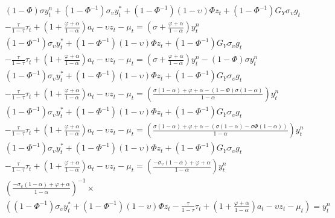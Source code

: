 \begin{align}    
    &(1 - \Phi)\sigma y^n_t +(1 - \Phi^{-1}) \sigma_\upsilon y^*_t + (1 - \Phi^{-1}) (1-\upsilon)\Phi z_t + (1 - \Phi^{-1}) G_Y \sigma_\upsilon g_t \nonumber \\
        &- \frac{\tau}{1-\tau}\tau_t  + \left(1 + \frac{\varphi + \alpha}{1-\alpha}\right)a_t - \upsilon z_t -\mu_t = \left(\sigma + \frac{\varphi + \alpha}{1-\alpha}\right)y^n_t\\
    &(1 - \Phi^{-1}) \sigma_\upsilon y^*_t + (1 - \Phi^{-1}) (1-\upsilon)\Phi z_t + (1 - \Phi^{-1}) G_Y \sigma_\upsilon g_t \nonumber \\ 
        &- \frac{\tau}{1-\tau}\tau_t  + \left(1 + \frac{\varphi + \alpha}{1-\alpha}\right)a_t - \upsilon z_t -\mu_t = \left(\sigma + \frac{\varphi + \alpha}{1-\alpha}\right)y^n_t - (1 - \Phi)\sigma y^n_t\\
    &(1 - \Phi^{-1}) \sigma_\upsilon y^*_t + (1 - \Phi^{-1}) (1-\upsilon)\Phi z_t + (1 - \Phi^{-1}) G_Y \sigma_\upsilon g_t \nonumber \\ 
        &- \frac{\tau}{1-\tau}\tau_t  + \left(1 + \frac{\varphi + \alpha}{1-\alpha}\right)a_t - \upsilon z_t -\mu_t = \left(\frac{\sigma(1-\alpha) + \varphi + \alpha-(1-\Phi)\sigma(1-\alpha)}{1-\alpha}\right)y^n_t\\
    &(1 - \Phi^{-1}) \sigma_\upsilon y^*_t + (1 - \Phi^{-1}) (1-\upsilon)\Phi z_t + (1 - \Phi^{-1}) G_Y \sigma_\upsilon g_t \nonumber \\ 
        &- \frac{\tau}{1-\tau}\tau_t  + \left(1 + \frac{\varphi + \alpha}{1-\alpha}\right)a_t - \upsilon z_t -\mu_t = \left(\frac{\sigma(1-\alpha) + \varphi + \alpha-(\sigma(1-\alpha)-\sigma\Phi(1-\alpha))}{1-\alpha}\right)y^n_t\\
    &(1 - \Phi^{-1}) \sigma_\upsilon y^*_t + (1 - \Phi^{-1}) (1-\upsilon)\Phi z_t + (1 - \Phi^{-1}) G_Y \sigma_\upsilon g_t \nonumber \\ 
        &- \frac{\tau}{1-\tau}\tau_t  + \left(1 + \frac{\varphi + \alpha}{1-\alpha}\right)a_t - \upsilon z_t -\mu_t = \left(\frac{-\sigma_\upsilon(1-\alpha) + \varphi + \alpha}{1-\alpha}\right)y^n_t\\
    &\left(\frac{-\sigma_\upsilon(1-\alpha) + \varphi + \alpha}{1-\alpha}\right)^{-1}\times \nonumber \\ 
        &\left((1 - \Phi^{-1}) \sigma_\upsilon y^*_t + (1 - \Phi^{-1}) (1-\upsilon)\Phi z_t - \frac{\tau}{1-\tau}\tau_t  + \left(1 + \frac{\varphi + \alpha}{1-\alpha}\right)a_t - \upsilon z_t -\mu_t \right)= y^n_t\\

\end{align}
